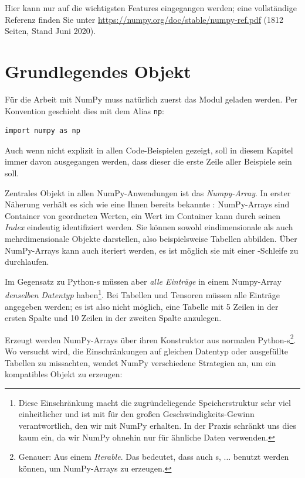 Hier kann nur auf die wichtigsten Features eingegangen werden; eine vollständige Referenz finden Sie unter \url{https://numpy.org/doc/stable/numpy-ref.pdf} (1812 Seiten, Stand Juni 2020).

\section{Grundlegendes Objekt}
Für die Arbeit mit NumPy muss natürlich zuerst das Modul geladen werden. Per Konvention geschieht dies mit dem Alias \texttt{np}:
\begin{codebox}
\begin{verbatim}
import numpy as np
\end{verbatim}
\end{codebox}

Auch wenn nicht explizit in allen Code-Beispielen gezeigt, soll in diesem Kapitel immer davon ausgegangen werden, dass dieser  die erste Zeile aller Beispiele sein soll.

Zentrales Objekt in allen NumPy-Anwendungen ist das \emph{Numpy-Array}. In erster Näherung verhält es sich wie eine Ihnen bereits bekannte : NumPy-Arrays sind Container von geordneten Werten, \ie ein Wert im Container kann durch seinen \emph{Index} eindeutig identifiziert werden. Sie können sowohl eindimensionale als auch mehrdimensionale Objekte darstellen, also beispielsweise Tabellen abbilden. Über NumPy-Arrays kann auch iteriert werden, \ie es ist möglich sie mit einer -Schleife zu durchlaufen.

Im Gegensatz zu Python-s müssen aber \emph{alle Einträge} in einem Numpy-Array \emph{denselben Datentyp} haben\footnote{Diese Einschränkung macht die zugründeliegende Speicherstruktur sehr viel einheitlicher und ist mit für den großen Geschwindigkeits-Gewinn verantwortlich, den wir mit NumPy erhalten. In der Praxis schränkt uns dies kaum ein, da wir NumPy ohnehin nur für ähnliche Daten verwenden.}. Bei Tabellen und Tensoren müssen alle Einträge angegeben werden; es ist also nicht möglich, eine Tabelle mit 5 Zeilen in der ersten Spalte und 10 Zeilen in der zweiten Spalte anzulegen.

Erzeugt werden NumPy-Arrays über ihren Konstruktor aus normalen Python-s\footnote{Genauer: Aus einem \emph{Iterable}. Das bedeutet, dass auch s, ... benutzt werden können, um NumPy-Arrays zu erzeugen.}. Wo versucht wird, die Einschränkungen auf gleichen Datentyp oder ausgefüllte Tabellen zu missachten, wendet NumPy verschiedene Strategien an, um ein kompatibles Objekt zu erzeugen:

